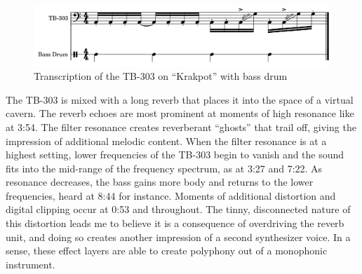 \documentclass[12pt,twoside]{reedthesis}
\begin{document}
\begin{figure}[htbp]
	\begin{centering}
		\includegraphics[width=6in]{./Images/Krakpot_bass2}
		\caption{Transcription of the TB-303 on ``Krakpot'' with bass drum}
		\label{fig:krakpotbass}
	\end{centering}
\end{figure}

The TB-303 is mixed with a long reverb that places it into the space of a virtual cavern. The reverb echoes are most prominent at moments of high resonance like at 3:54. The filter resonance creates reverberant ``ghosts'' that trail off, giving the impression of additional melodic content. When the filter resonance is at a highest setting, lower frequencies of the TB-303 begin to vanish and the sound fits into the mid-range of the frequency spectrum, as at 3:27 and 7:22. As resonance decreases, the bass gains more body and returns to the lower frequencies, heard at 8:44 for instance. Moments of additional distortion and digital clipping occur at 0:53 and throughout. The tinny, disconnected nature of this distortion leads me to believe it is a consequence of overdriving the reverb unit, and doing so creates another impression of a second synthesizer voice. In a sense, these effect layers are able to create polyphony out of a monophonic instrument.
\end{document}

